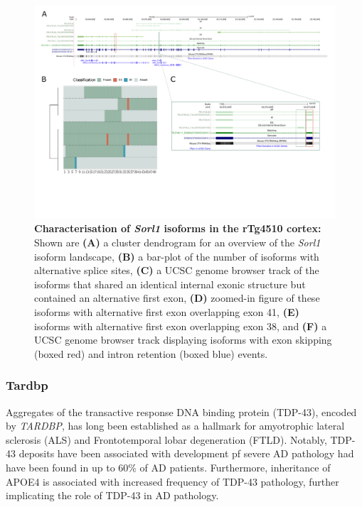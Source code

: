 \begin{landscape}
	\begin{figure}[htp]
		\centering
		\captionsetup{width=1.3\textwidth}
		\includegraphics[page=10,trim={0 0.5cm 0 0},scale = 0.8]{Figures/TargetGenes_Annotation_Landscape.pdf}
		\caption[Characterisation of \textit{Sorl1} isoforms in the rTg4510 cortex]%
		{\textbf{Characterisation of \textit{Sorl1} isoforms in the rTg4510 cortex:} Shown are \textbf{(A)} a cluster dendrogram for an overview of the \textit{Sorl1} isoform landscape, \textbf{(B)} a bar-plot of the number of isoforms with alternative splice sites, \textbf{(C)} a UCSC genome browser track of the isoforms that shared an identical internal exonic structure but contained an alternative first exon, \textbf{(D)} zoomed-in figure of these isoforms with alternative first exon overlapping exon 41, \textbf{(E)} isoforms with alternative first exon overlapping exon 38, and \textbf{(F)} a UCSC genome browser track displaying isoforms with exon skipping (boxed red) and intron retention (boxed blue) events.}    
		\label{fig:sorl1}
	\end{figure}
\end{landscape}
\restoregeometry

\newpage
\subsubsection{Tardbp}
Aggregates of the transactive response DNA binding protein (TDP-43), encoded by \textit{TARDBP}, has long been established as a hallmark for amyotrophic lateral sclerosis (ALS) and Frontotemporal lobar degeneration (FTLD)\cite{Meneses2021}. Notably, TDP-43 deposits have been associated with development pf severe AD pathology had have been found in up to 60\% of AD patients\cite{Brouwers2010}. Furthermore, inheritance of APOE4 is associated with increased frequency of TDP-43 pathology, further implicating the role of TDP-43 in AD pathology\cite{Meneses2021}. 

